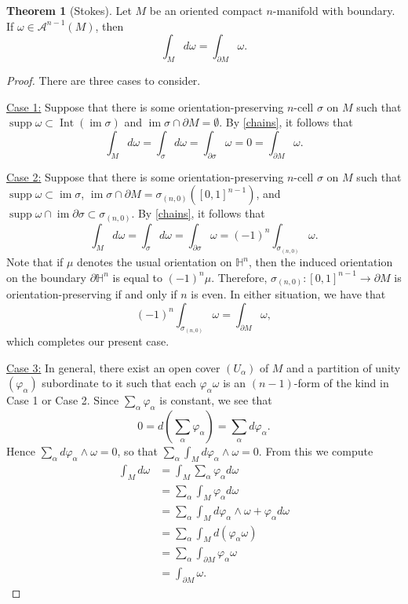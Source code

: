 \documentclass[10pt,letterpaper,cm]{nupset}
\theoremstyle{definition}
\theoremstyle{theorem}
\newtheorem{theorem}[definition]{Theorem}
\theoremstyle{remark}
\renewcommand{\H}{\mathbb H}
\newcommand{\1}{\mathbf{1}}
\newcommand{\0}{\vec 0}
\DeclareMathOperator{\im}{im}
\DeclareMathOperator{\Int}{Int}
\DeclareMathOperator{\supp}{supp}
\begin{document}
\begin{theorem}[Stokes]\label{stokes}
Let $M$ be an oriented compact $n$-manifold with boundary. If $\omega \in \mathcal{A}^{n-1}(M)$, then $$ \int_M d\omega = \int_{\partial{M}} \omega  .$$
\end{theorem}
\begin{proof} There are three cases to consider.

\medskip


\underline{Case 1:} Suppose that there is some orientation-preserving $n$-cell $\sigma$ on $M$ such that $\supp \omega \subset \Int(\im \sigma)$ and $\im \sigma \cap \partial{M} =\emptyset$. By \cref{chains}, it follows that $$\int_M d\omega  = \int_{\sigma} d\omega = \int_{\partial{\sigma}} \omega = 0 = \int_{\partial{M}} \omega    .$$

\medskip


\underline{Case 2:} Suppose that there is some orientation-preserving $n$-cell $\sigma$ on $M$ such that $\supp \omega \subset  \im \sigma$, $\im \sigma \cap \partial{M} =\sigma_{(n,0)}\left(\left[0,1\right]^{n-1}\right)$, and $\supp \omega \cap \im \partial{\sigma} \subset \sigma_{(n,0)}$. By \cref{chains}, it follows that $$\int_M d\omega  = \int_{\sigma} d\omega = \int_{\partial{\sigma}} \omega = \left({-1}\right)^n \int_{\sigma_{(n,0)}} \omega .$$ Note that if $\mu$ denotes the usual orientation on $\H^n$, then the induced orientation on the boundary $\partial{\H^n}$ is equal to $\left({-1}\right)^n \mu$. Therefore, $\sigma_{(n,0)} : \left[0,1\right]^{n-1}\to \partial{M}$ is orientation-preserving  if and only if $n$ is even. In either situation, we have that $$\left({-1}\right)^n \int_{\sigma_{(n,0)}} \omega = \int_{\partial{M}} \omega  ,$$ which completes our present case.

\medskip


\underline{Case 3:} In general, there exist an open cover $\left(U_{\alpha}\right)$ of $M$ and a partition of unity $\left(\varphi_{\alpha}\right)$ subordinate to it such that each $\varphi_{\alpha}\omega$ is an $\left(n-1\right)$-form of the kind in Case 1 or Case 2. Since $\sum_{\alpha} \varphi_{\alpha}$ is constant, we see that $$0 = d\left(\sum_{\alpha} \varphi_{\alpha} \right) = \sum_{\alpha} d \varphi_{\alpha}.$$ Hence $ \sum_{\alpha} d \varphi_{\alpha} \wedge \omega =0$, so that $\sum_{\alpha} \int_M d\varphi_{\alpha} \wedge \omega =0$. From this we compute
\begin{align*}
 \int_M d\omega & = \int_M \sum_{\alpha} \varphi_{\alpha} d\omega 
 \\ & = \sum_{\alpha}\int_M \varphi_{\alpha} d\omega
\\ & =  \sum_{\alpha}\int_M d\varphi_{\alpha} \wedge \omega + \varphi_{\alpha} d\omega 
\\ & =  \sum_{\alpha}\int_M d(\varphi_{\alpha} \omega)
\\ & = \sum_{\alpha} \int_{\partial{M}} \varphi_{\alpha} \omega 
\\ & =  \int_{\partial{M}} \omega .
\end{align*}
\end{proof}
\end{document}
